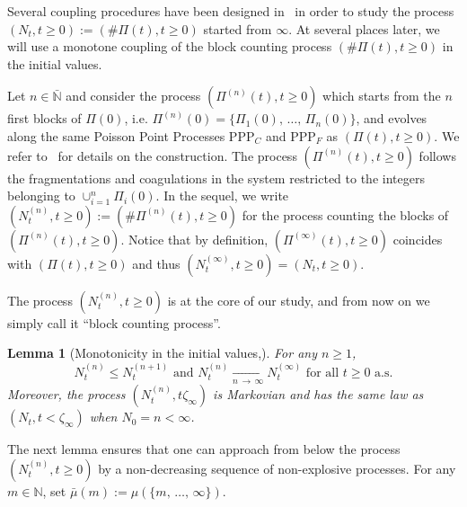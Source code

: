 \documentclass[10pt]{amsart}
\newtheorem{lemm}[theo]{Lemma}\newtheorem{prop}[theo]{Proposition}\newtheorem{coro}[theo]{Corollary}\newtheorem{conj}[theo]{Conjecture}
\theoremstyle{definition}\newtheorem{defi}[theo]{Definition}\newtheorem{rema}[theo]{Remark}\newtheorem{exam}[theo]{Example}\newtheorem{exem}[theo]{Example}\newtheorem{nota}[theo]{Notation}
\newcommand{\PPP}{\mathrm{PPP}}
\newcommand{\bbN}{\mathbb{N}}
\begin{document}
Several coupling procedures have been designed in~\cite{cdiEFC} in order to study the process $(N_t,t\geq 0):=(\#\Pi(t),t\geq 0)$ started from $\infty$. At several places later, we will use a monotone coupling of the block counting process $(\#\Pi(t),t\geq 0)$ in the initial values.

Let $n\in \bar{\bbN}$ and consider the process $(\Pi^{(n)}(t),t\geq 0)$ which starts from the $n$ first blocks of $\Pi(0)$, i.e. $\Pi^{(n)}(0)=\{\Pi_1(0),\,\ldots,\,\Pi_n(0)\}$, and evolves along the same Poisson Point Processes $\PPP_C$ and $\PPP_F$ as $(\Pi(t),t\geq 0)$. We refer to~\cite[Lemma~3.3 and Lemma~3.4]{cdiEFC} for details on the construction. The process $(\Pi^{(n)}(t),t\geq 0)$ follows the fragmentations and coagulations in the system restricted to the integers belonging to $\cup_{i=1}^{n}\Pi_i(0)$. In the sequel, we write $(N_t^{(n)},t\geq 0):=(\#\Pi^{(n)}(t),t\geq 0)$ for the process counting the blocks of $(\Pi^{(n)}(t),t\geq 0)$. Notice that by definition, $(\Pi^{(\infty)}(t),t\geq 0)$ coincides with $(\Pi(t),t\geq 0)$ and thus $(N_t^{(\infty)},t\geq 0)=(N_t,t\geq 0)$.

The process $(N_t^{(n)},t\geq 0)$ is at the core of our study, and from now on we simply call it ``block counting process''.
\begin{lemm}[{Monotonicity in the initial values,\cite[Lemma~3.4]{cdiEFC}}]\label{monotonicity}
For any $n\geq 1$,
\begin{equation*}
N_t^{(n)}\leq N^{(n+1)}_t\text{ and }N_t^{(n)}\underset{n\,\rightarrow\,\infty}{\longrightarrow} N^{(\infty)}_t\text{ for all }t\geq 0\text{ a.s.}
\end{equation*}
Moreover, the process $(N^{(n)}_t,t\zeta_{\infty})$ is Markovian and has the same law as $(N_t,t<\zeta_{\infty})$ when $N_0=n<\infty$.
\end{lemm}

The next lemma ensures that one can approach from below the process $(N_t^{(n)},t\geq 0)$ by a non-decreasing sequence of non-explosive processes. For any $m\in \bbN$, set $\bar{\mu}(m):=\mu(\{m,\,\ldots,\,\infty\})$.
\end{document}
